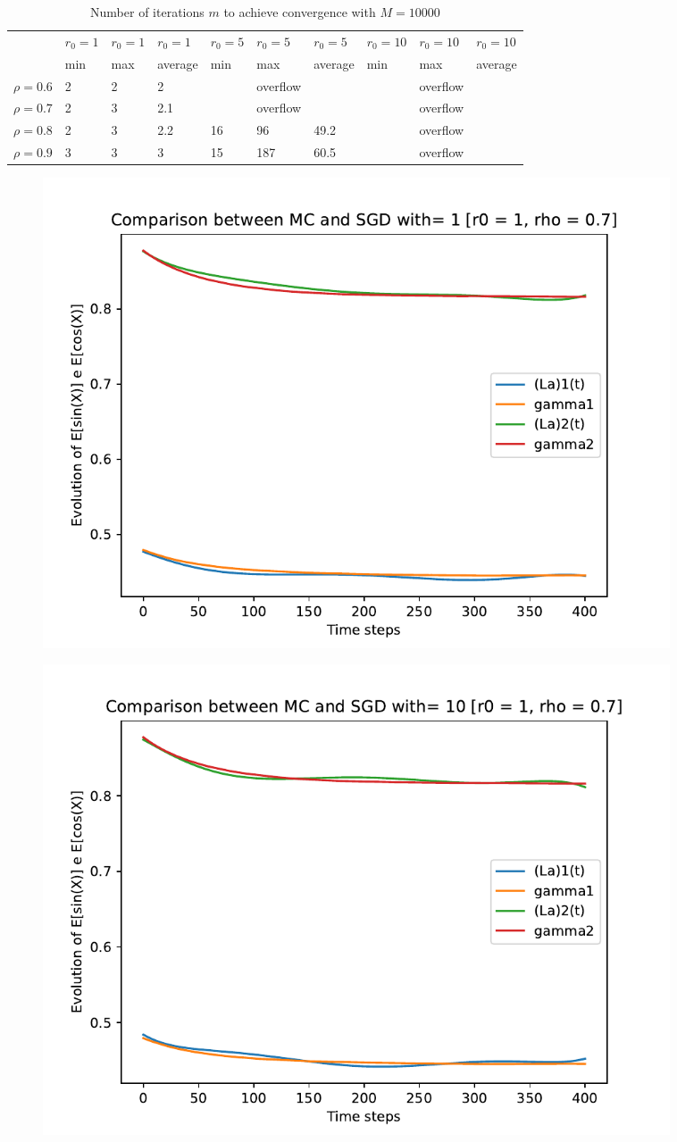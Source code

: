 \documentclass[a4paper,11pt,openright]{report}
\begin{document}
\begin{table}[H]
\centering
\addtolength{\leftskip}{-1.5cm}
\addtolength{\rightskip}{-1.5cm}
\begin{tabular}{|c|lllllllll|}
\hline
$ $ & $r_0 = 1$ & $r_0 = 1$ & $r_0 = 1$ & $r_0 = 5$ & $r_0 = 5$ & $r_0 = 5$ & $r_0 = 10$ & $r_0 = 10$ & $r_0 = 10$  \\
$ $ & min & max & average & min & max & average & min & max & average \\ 
\hline
$\rho = 0.6$ & 2 & 2 & 2 &  & overflow &  &  & overflow &  \\

$\rho = 0.7$ & 2 & 3 & 2.1 &  & overflow &  &  & overflow &  \\

$\rho = 0.8$ & 2 & 3 & 2.2 & 16 & 96 & 49.2 &  & overflow &  \\

$\rho = 0.9$ & 3 & 3 & 3 & 15 & 187 & 60.5 &  & overflow &  \\
\hline
\end{tabular}
\caption{Number of iterations $m$ to achieve convergence with $M = 10000$}
\end{table}
\begin{figure}[H]
\centering
\includegraphics[width=0.9\textwidth]{images/graphs T = 4/n = 6, M = 1 sine and cosine.pdf}
\end{figure}
\begin{figure}[H]
\centering
\includegraphics[width=0.9\textwidth]{images/graphs T = 4/n = 6, M = 10 sine and cosine.pdf}
\end{figure}
\end{document}
